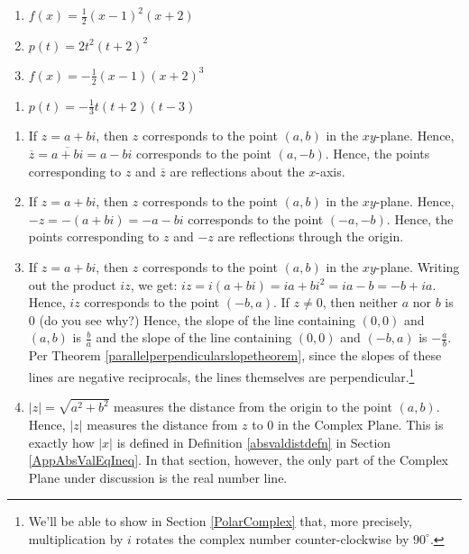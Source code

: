 \documentclass{ximera}
\begin{document}
\begin{multicols}{3}
\begin{enumerate}
\setcounter{enumi}{\value{HW}}


\item $f(x) =\frac{1}{2} (x-1)^2 (x+2)$
\item $p(t) =2 t^2 (t+2)^2$
\item $f(x) =-\frac{1}{2} (x-1) (x+2)^3$


\setcounter{HW}{\value{enumi}}
\end{enumerate}
\end{multicols}

\begin{enumerate}
\setcounter{enumi}{\value{HW}}

\item $p(t) = -\frac{1}{3} t(t+2)(t-3)$

\setcounter{HW}{\value{enumi}}
\end{enumerate}

\begin{enumerate}
\setcounter{enumi}{\value{HW}}

\item If $z = a+bi$, then $z$ corresponds to the point $(a,b)$ in the $xy$-plane.  Hence, $\overline{z} = \overline{a+bi} = a-bi$ corresponds to the point $(a,-b)$.  Hence, the points corresponding to $z$ and $\overline{z}$ are reflections about the $x$-axis.

\item    If $z = a+bi$, then $z$ corresponds to the point $(a,b)$ in the $xy$-plane.  Hence, $-z =-(a+bi) = -a-bi$ corresponds to the point $(-a,-b)$.  Hence, the points corresponding to $z$ and $-z$ are reflections through the origin.

\item  If $z = a+bi$, then $z$ corresponds to the point $(a,b)$ in the $xy$-plane.  Writing out the product $iz$, we get: $iz =i(a+bi) = ia+bi^2 = ia - b = -b+ia$.  Hence, $iz$ corresponds to the point $(-b,a)$.  If $z \neq 0$, then neither $a$ nor $b$ is $0$ (do you see why?) Hence, the slope of the line containing $(0,0)$ and $(a,b)$ is $\frac{b}{a}$ and the slope of the line containing $(0,0)$ and $(-b,a)$ is $-\frac{a}{b}$.  Per Theorem \ref{parallelperpendicularslopetheorem}, since the slopes of these lines are negative reciprocals, the lines themselves are perpendicular.\footnote{We'll be able to show in Section \ref{PolarComplex}  that, more precisely, multiplication by $i$ rotates the complex number counter-clockwise by $90^{\circ}$.}

\item $|z| = \sqrt{a^2+b^2}$ measures the distance from the origin to the point $(a,b)$.  Hence, $|z|$ measures the distance from $z$ to $0$ in the Complex Plane.  This is exactly how $|x|$ is defined in Definition \ref{absvaldistdefn} in Section \ref{AppAbsValEqIneq}.  In that section, however,  the only part of the Complex Plane under discussion is the real number line.

\setcounter{HW}{\value{enumi}}
\end{enumerate}
\end{document}
